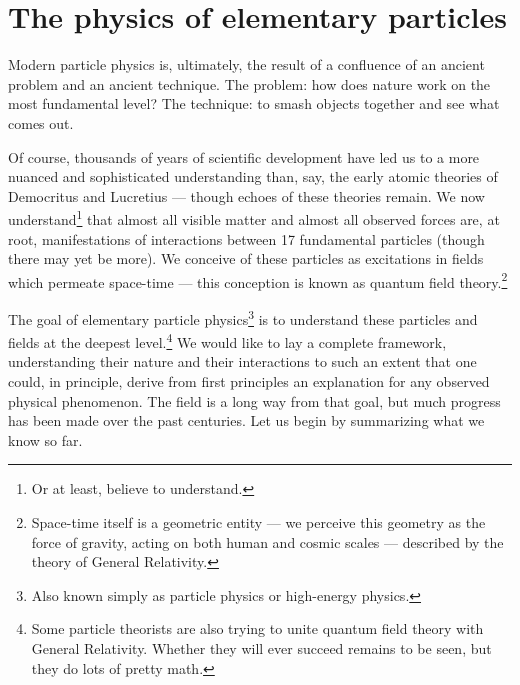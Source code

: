\documentclass[../thesis.tex]{subfiles}
\begin{document}
\section{The physics of elementary particles}
	Modern particle physics is, ultimately, the result of a confluence of an ancient problem and an ancient technique. The problem: how does nature work on the most fundamental level? The technique: to smash objects together and see what comes out. 

	Of course, thousands of years of scientific development have led us to a more nuanced and sophisticated understanding than, say, the early atomic theories of Democritus and Lucretius --- though echoes of these theories remain. We now understand\footnote{Or at least, believe to understand.} that almost all visible matter and almost all observed forces are, at root, manifestations of interactions between 17 fundamental particles (though there may yet be more). We conceive of these particles as excitations in fields which permeate space-time --- this conception is known as quantum field theory.\footnote{Space-time itself is a geometric entity --- we perceive this geometry as the force of gravity, acting on both human and cosmic scales --- described by the theory of General Relativity.}

	The goal of elementary particle physics\footnote{Also known simply as particle physics or high-energy physics.} is to understand these particles and fields at the deepest level.\footnote{Some particle theorists are also trying to unite quantum field theory with General Relativity. Whether they will ever succeed remains to be seen, but they do lots of pretty math.} We would like to lay a complete framework, understanding their nature and their interactions to such an extent that one could, in principle, derive from first principles an explanation for any observed physical phenomenon. The field is a long way from that goal, but much progress has been made over the past centuries. Let us begin by summarizing what we know so far.
\end{document}
